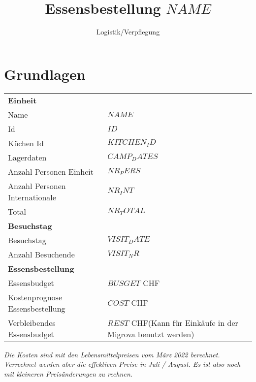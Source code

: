 \documentclass[11pt]{article}
\author{Logistik/Verpflegung}
\title{Essensbestellung $NAME$}
\begin{document}
	\section*{Grundlagen}

		\begin{tabular}{ll}
            \textbf{Einheit}\\
            Name & $NAME$ \\
            Id & $ID$\\
            K\"uchen Id & $KITCHEN_ID$\\
            Lagerdaten & $CAMP_DATES$ \\
            Anzahl Personen Einheit & $NR_PERS$\\
            Anzahl Personen Internationale & $NR_INT$\\
            Total & $NR_TOTAL$\\
            \textbf{Besuchstag}\\
            Besuchstag & $VISIT_DATE$\\
            Anzahl Besuchende & $VISIT_NR$\\
            \textbf{Essensbestellung}\\
            Essensbudget & $BUSGET$ CHF\\
            Kostenprognose Essensbestellung & $COST$ CHF\\
            Verbleibendes Essensbudget & $REST$ CHF\hspace{1cm}(Kann f\"ur Eink\"aufe in der Migrova benutzt werden)  \\
        \end{tabular}

\vspace{1cm}
\textit{Die Kosten sind mit den Lebensmittelpreisen vom M\"arz 2022 berechnet. Verrechnet werden aber die effektiven Preise in Juli / August. Es ist also noch mit kleineren Preis\"anderungen zu rechnen.}
\color{black}

\newpage
\small
\end{document}
